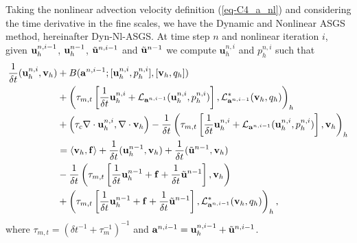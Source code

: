 Taking the nonlinear advection velocity definition (\ref{eq-C4_a_nl}) and considering the time derivative in the fine scales, we have the Dynamic and Nonlinear ASGS method, hereinafter Dyn-Nl-ASGS. 
At time step $n$ and nonlinear iteration $i$, given ${\bf u}_h^{n,i-1}$, ${\bf u}_h^{n-1}$, $\tilde{{\bf u}}^{n,i-1}$ and $\tilde{{\bf u}}^{n-1}$ we compute $\mathbf{u}_h^{n,i}$ and $ p_h^{n,i} $ such that
\begin{align}
\label{eq-C4_Dyn-Nl-ASGS}
\frac{1}{\delta t}({\bf u}_h^{n,i},{\bf v}_h)
&+ B({\bf a}^{n,i-1};[{\bf u}_h^{n,i},p_h^{n,i}],[{\bf v}_h,q_h])
\\ \nonumber
&+\left(\tau_{m,t} \left[\frac{1}{\delta t}{\bf u}_h^{n,i}+ \mathcal{L}_{{\bf a}^{n,i-1}}({\bf u}_h^{n,i},p_h^{n,i})\right], \mathcal{L}^*_{{\bf a}^{n,i-1}}({\bf v}_h,q_h) \right)_h\\ \nonumber
&+\left(\tau_c\nabla\cdot{\bf u}_h^{n,i},\nabla\cdot{\bf v}_h\right)
-\frac{1}{\delta t} \left(\tau_{m,t}\left[\frac{1}{\delta t}{\bf u}_h^{n,i}+ \mathcal{L}_{{\bf a}^{n,i-1}}({\bf u}_h^{n,i},p_h^{n,i})\right],{\bf v}_h\right)_h \\\nonumber
&=\langle{\bf v}_h,\mathbf{f}\rangle
+\frac{1}{\delta t}({\bf u}_h^{n-1},{\bf v}_h)+\frac{1}{\delta t}(\tilde{{\bf u}}^{n-1},{\bf v}_h) \\\nonumber
&-\frac{1}{\delta t}\left(\tau_{m,t}\left[\frac{1}{\delta t}{\bf u}_h^{n-1}+\mathbf{f}+\frac{1}{\delta t}\tilde{{\bf u}}^{n-1}\right],{\bf v}_h\right) \\\nonumber
&+\left(\tau_{m,t}\left[\frac{1}{\delta t}{\bf u}_h^{n-1}+\mathbf{f}+\frac{1}{\delta t}\tilde{{\bf u}}^{n-1}\right],\mathcal{L}^*_{{\bf a}^{n,i-1}}({\bf v}_h,q_h) \right)_h,
\label{eq-C4_Dyn-Nl-ASGS}
\end{align}
where $\tau_{m,t}=\left(\delta t^{-1}+\tau_m^{-1}\right)^{-1}$ and ${\bf a}^{n,i-1}={\bf u}_h^{n,i-1}+\tilde{{\bf u}}^{n,i-1}$.

